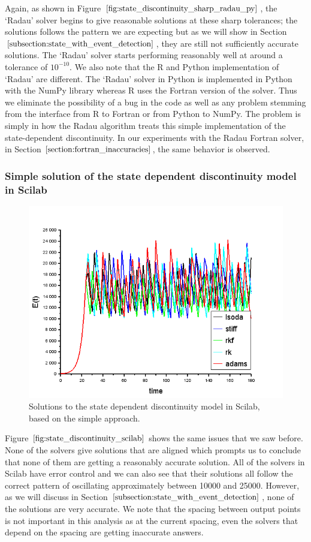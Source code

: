 Again, as shown in Figure $\ref{fig:state_discontinuity_sharp_radau_py}$, the `Radau' solver begins to give reasonable solutions at these sharp tolerances; the solutions follows the pattern we are expecting but as we will show in Section $\ref{subsection:state_with_event_detection}$, they are still not sufficiently accurate solutions. The `Radau' solver starts performing reasonably well at around a tolerance of $10^{-10}$. We also note that the R and Python implementation of `Radau' are different. The `Radau' solver in Python is implemented in Python with the NumPy library whereas R uses the Fortran version of the solver. Thus we eliminate the possibility of a bug in the code as well as any problem stemming from the interface from R to Fortran or from Python to NumPy. The problem is simply in how the Radau algorithm treats this simple implementation of the state-dependent discontinuity. In our experiments with the Radau Fortran solver, in Section $\ref{section:fortran_inaccuracies}$, the same behavior is observed.

\subsubsection{Simple solution of the state dependent discontinuity model in Scilab}
\begin{figure}[H]
\centering
\includegraphics[width=0.7\linewidth]{./figures/state_discontinuity_scilab}
\caption{Solutions to the state dependent discontinuity model in Scilab, based on the simple approach.}
\label{fig:state_discontinuity_scilab}
\end{figure}

Figure $\ref{fig:state_discontinuity_scilab}$ shows the same issues that we saw before. None of the solvers give solutions that are aligned which prompts us to conclude that none of them are getting a reasonably accurate solution. All of the solvers in Scilab have error control and we can also see that their solutions all follow the correct pattern of oscillating approximately between 10000 and 25000. However, as we will discuss in Section $\ref{subsection:state_with_event_detection}$, none of the solutions are very accurate. We note that the spacing between output points is not important in this analysis as at the current spacing, even the solvers that depend on the spacing are getting inaccurate answers.

